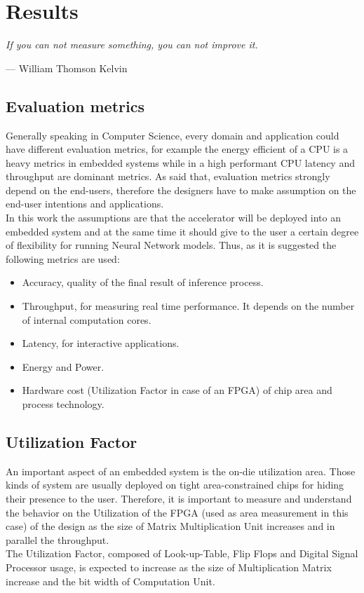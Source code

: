 \chapter{Results}

\epigraph{ \textit{If you can not measure something, you can not improve it.}}{--- \textup{William Thomson Kelvin}}

\section{Evaluation metrics}
Generally speaking in Computer Science, every domain and application could have different evaluation metrics, for example the energy efficient of a CPU is a heavy metrics in embedded systems while in a high performant CPU latency and throughput are dominant metrics. As said that, evaluation metrics strongly depend on the end-users, therefore the designers have to make assumption on the end-user intentions and applications.\\
In this work the assumptions are that the accelerator will be deployed into an embedded system and at the same time it should give to the user a certain degree of flexibility for running Neural Network models. Thus, as it is suggested \cite{paper:1} the following metrics are used:
\begin{itemize}
\item Accuracy, quality of the final result of inference process.
\item Throughput, for measuring real time performance. It depends on the number of internal computation cores.
\item Latency, for interactive applications.
\item Energy and Power.
\item Hardware cost (Utilization Factor in case of an FPGA) of chip area and process technology.
\end{itemize}
\newpage
\section{Utilization Factor}
An important aspect of an embedded system is the on-die utilization area. Those kinds of system are usually deployed on tight area-constrained chips for hiding their presence to the user.
Therefore, it is important to measure and understand the behavior on the Utilization of the FPGA (used as area measurement in this case) of the design as the size of Matrix Multiplication Unit increases and in parallel the throughput.\\
The Utilization Factor, composed of Look-up-Table, Flip Flops and Digital Signal Processor usage, is expected to increase as the size of Multiplication Matrix increase and the bit width of Computation Unit.

